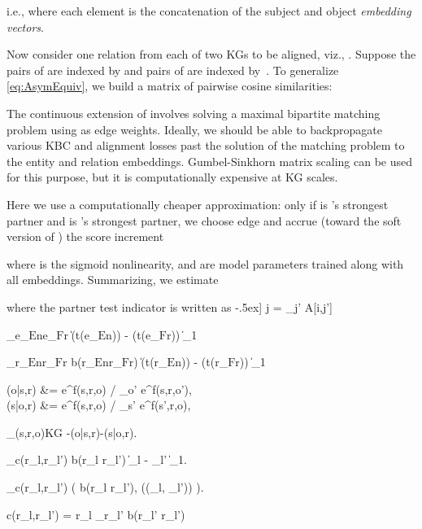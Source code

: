 \documentclass[11pt]{article}
\DeclareMathOperator{\mBERT}{bert}
\DeclareMathOperator*{\argmax}{argmax}
\def\En{\ensuremath{\text{En}}}
\def\Fr{\ensuremath{\text{Fr}}}
\def\KG{\ensuremath{\text{KG}}}
\begin{document}
i.e., where each element is the concatenation of the subject and object \emph{embedding vectors}. 

Now consider one relation from each of two KGs to be aligned, viz., .  Suppose the  pairs of  are indexed by  and pairs of  are indexed by~.  To generalize \eqref{eq:AsymEquiv}, we build a matrix  of pairwise cosine similarities:

The continuous extension of  involves solving a maximal bipartite matching problem using  as edge weights.  Ideally, we should be able to backpropagate various KBC and alignment losses past the solution of the matching problem to the entity and relation embeddings.  Gumbel-Sinkhorn matrix scaling \citep{Cuturi2013sinkhorn, Mena+2018GumbelSinkhorn} can be used for this purpose, but it is computationally expensive at KG scales.

 Here we use a computationally cheaper approximation: only if  is 's strongest partner and  is 's strongest partner, we choose edge  and accrue (toward the soft version of ) the score increment

where  is the sigmoid nonlinearity, and  are model parameters trained along with all embeddings.  Summarizing, we estimate

where the partner test indicator is written as
-.5ex] 
\llbracket \textstyle 
j = \argmax_{j'} A[i,j'] \rrbracket

\sum_{e_\En \equiv e_\Fr} \hspace{-.4em}
\big\| \mBERT(t(e_\En)) {-} \mBERT(t(e_\Fr)) \big\|_1

\sum_{r_\En \equiv r_\Fr}
b(r_\En \Leftrightarrow r_\Fr)
\big\| \mBERT(t(r_\En)) - \mBERT(t(r_\Fr)) \big\|_1

\Pr(o|s,r) &= e^{f(s,r,o)} \Big/
\textstyle \sum_{o'} e^{f(s,r,o')}, 
\label{eq:pro} \\
\Pr(s|o,r) &= e^{f(s,r,o)} \Big/
\textstyle \sum_{s'} e^{f(s',r,o)},
\label{eq:prs}

\sum_{(s,r,o)\in\KG}
-\log\Pr(o|s,r)-\log\Pr(s|o,r).

\sum_{c(r_{l},r_{l'})}
b(r_{l} \Leftrightarrow r_{l'})
\big\| _{l} - _{l'} \big\|_1.

\sum_{c(r_{l},r_{l'})}
\big( b(r_{l} \Leftrightarrow r_{l'}),
\sigma(\cos(_{l}, _{l'})) \big).

    c(r_{l},r_{l'}) = 
    \llbracket \textstyle 
    r_{l} \equiv \argmax_{r_{l}'} b(r_{l'} \Rightarrow r_{l}') \rrbracket
    \
\end{document}
